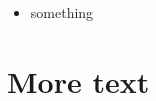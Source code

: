 


\begin{itemize}
  \item something
\end{itemize}

\begin{comment}
  FIXME: Move this out
\end{comment}

\section{More text}

\begin{comment}
  TODO: Do many multiple multiple line comments work?
\end{comment}
